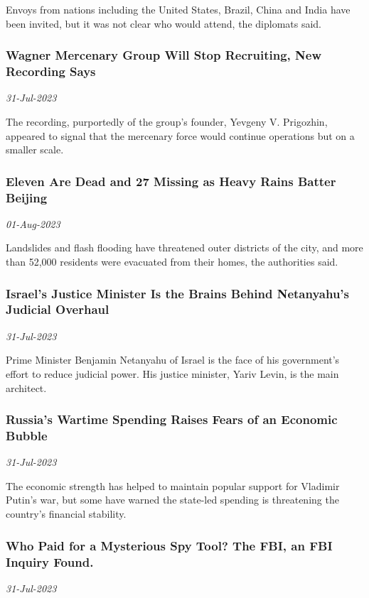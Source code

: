 Envoys from nations including the United States, Brazil, China and India have been invited, but it was not clear who would attend, the diplomats said.
\subsubsection{Wagner Mercenary Group Will Stop Recruiting, New Recording Says \href{https://www.nytimes.com/2023/07/31/world/europe/wagner-prigozhin-recruiting-belarus-africa.html}{}}
\textit{31-Jul-2023}

The recording, purportedly of the group’s founder, Yevgeny V. Prigozhin, appeared to signal that the mercenary force would continue operations but on a smaller scale.
\subsubsection{Eleven Are Dead and 27 Missing as Heavy Rains Batter Beijing \href{https://www.nytimes.com/2023/07/31/world/asia/china-rain-beijing-flooding-typhoon.html}{}}
\textit{01-Aug-2023}

Landslides and flash flooding have threatened outer districts of the city, and more than 52,000 residents were evacuated from their homes, the authorities said.
\subsubsection{Israel’s Justice Minister Is the Brains Behind Netanyahu’s Judicial Overhaul \href{https://www.nytimes.com/2023/07/31/world/middleeast/yariv-levin-israel-judicial-law-netanyahu.html}{}}
\textit{31-Jul-2023}

Prime Minister Benjamin Netanyahu of Israel is the face of his government’s effort to reduce judicial power. His justice minister, Yariv Levin, is the main architect.
\subsubsection{Russia’s Wartime Spending Raises Fears of an Economic Bubble \href{https://www.nytimes.com/2023/07/31/world/europe/russia-war-economy.html}{}}
\textit{31-Jul-2023}

The economic strength has helped to maintain popular support for Vladimir Putin’s war, but some have warned the state-led spending is threatening the country’s financial stability.
\subsubsection{Who Paid for a Mysterious Spy Tool? The FBI, an FBI Inquiry Found. \href{https://www.nytimes.com/2023/07/31/us/politics/nso-spy-tool-landmark-fbi.html}{}}
\textit{31-Jul-2023}

